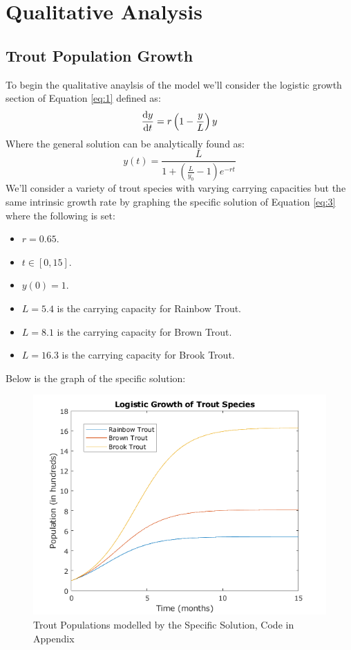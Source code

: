 \documentclass[letterpaper,12pt]{article}
\begin{document}
\section{Qualitative Analysis}
\subsection{Trout Population Growth}
To begin the qualitative anaylsis of the model we'll consider the logistic growth section of Equation \eqref{eq:1} defined as:
\begin{equation*}
    \dv{y}{t} = r\left(1 - \frac{y}{L}\right)y
\end{equation*}
Where the general solution can be analytically found as:
\begin{equation} \label{eq:3}
    y(t) = \frac{L}{1 + \left(\frac{L}{y_0} - 1\right)e^{-rt}}
\end{equation}
We'll consider a variety of trout species with varying carrying capacities but the same intrinsic growth rate by graphing the specific solution of Equation \eqref{eq:3} where the following is set:
\begin{itemize}
    \item \(r = 0.65\).
    \item \(t \in [0,15]\).
    \item \(y(0) = 1\).
    \item \(L = 5.4\) is the carrying capacity for Rainbow Trout.
    \item \(L = 8.1\) is the carrying capacity for Brown Trout.
    \item \(L = 16.3\) is the carrying capacity for Brook Trout.
\end{itemize}
Below is the graph of the specific solution:
\newline
\begin{figure}[H]
    \centering
    \includegraphics{./figures/fig.3.2.1.png}
    \caption{Trout Populations modelled by the Specific Solution, Code in Appendix}
    \label{fig:1}
\end{figure}
\end{document}
